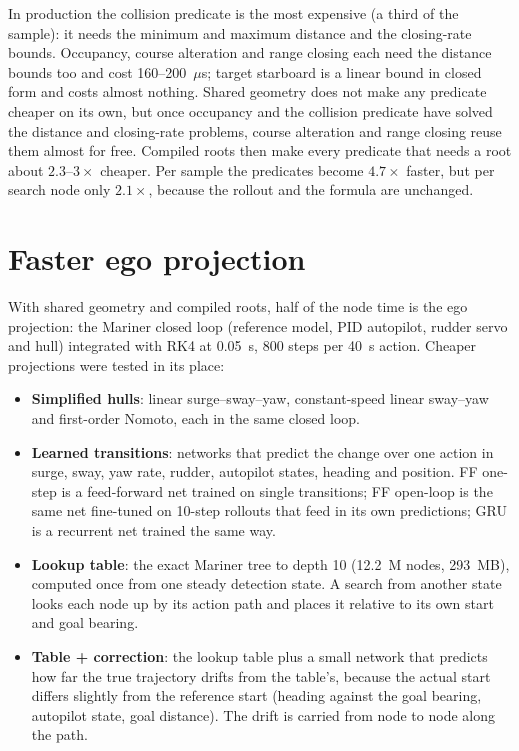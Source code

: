 \documentclass[11pt,a4paper]{article}
\begin{document}
In production the collision predicate is the most expensive (a third of the
sample): it needs the minimum and maximum distance and the closing-rate
bounds. Occupancy, course alteration and range closing each need the distance
bounds too and cost 160--200~$\mu$s; target starboard is a linear bound in
closed form and costs almost nothing. Shared geometry does not make any
predicate cheaper on its own, but once occupancy and the collision predicate
have solved the distance and closing-rate problems, course alteration and
range closing reuse them almost for free. Compiled roots then make every
predicate that needs a root about $2.3$--$3\times$ cheaper. Per sample the
predicates become $4.7\times$ faster, but per search node only $2.1\times$,
because the rollout and the formula are unchanged.

\section{Faster ego projection}
\label{sec:projection}

With shared geometry and compiled roots, half of the node time is the ego
projection: the Mariner closed loop (reference model, PID autopilot, rudder
servo and hull) integrated with RK4 at 0.05~s, 800 steps per 40~s action.
Cheaper projections were tested in its place:

\begin{itemize}
\item \textbf{Simplified hulls}: linear surge--sway--yaw, constant-speed
linear sway--yaw and first-order Nomoto, each in the same closed loop.
\item \textbf{Learned transitions}: networks that predict the change over one
action in surge, sway, yaw rate, rudder, autopilot states, heading and
position. FF one-step is a feed-forward net trained on single transitions; FF
open-loop is the same net fine-tuned on 10-step rollouts that feed in its own
predictions; GRU is a recurrent net trained the same way.
\item \textbf{Lookup table}: the exact Mariner tree to depth 10 (12.2~M nodes,
293~MB), computed once from one steady detection state. A search from another
state looks each node up by its action path and places it relative to its own
start and goal bearing.
\item \textbf{Table + correction}: the lookup table plus a small network that
predicts how far the true trajectory drifts from the table's, because the
actual start differs slightly from the reference start (heading against the
goal bearing, autopilot state, goal distance). The drift is carried from node
to node along the path.
\end{itemize}
\end{document}
